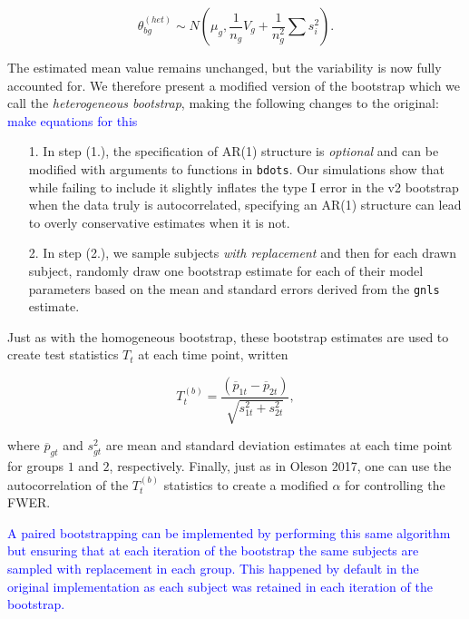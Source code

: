 \documentclass{article}
\newcommand{\xt}{\texttt}
\providecommand{\cn}[1]{\textcolor{blue}{#1}}
\begin{document}
\begin{equation}\label{eq:w_rep_boot}
\theta_{bg}^{(het)} \sim N \left( \mu_{g}, \frac{1}{n_g} V_{g} + \frac{1}{n_g^2} \sum s_i^2 \right).
\end{equation}

The estimated mean value remains unchanged, but the variability is now fully accounted for. We therefore present a modified version of the bootstrap which we call the \textit{heterogeneous bootstrap}, making the following changes to the original: \cn{make equations for this}

\begin{enumerate}
\item[1.] In step (1.), the specification of AR(1) structure is \textit{optional} and can be modified with arguments to functions in \xt{bdots}. Our simulations show that while failing to include it slightly inflates the type I error in the v2 bootstrap when the data truly is autocorrelated, specifying an AR(1) structure can lead to overly conservative estimates when it is not.
\item[2.] In step (2.), we sample subjects \textit{with replacement} and then for each drawn subject, randomly draw one bootstrap estimate for each of their model parameters based on the mean and standard errors derived from the \xt{gnls} estimate.
\end{enumerate}

Just as with the homogeneous bootstrap, these bootstrap estimates are used to create test statistics $T_t$ at each time point, written

\begin{equation}
T_t^{(b)} = \frac{(\overline{p}_{1t} - \overline{p}_{2t})}{\sqrt{s_{1t}^2 + s_{2t}^2}},
\end{equation}

where $\overline{p}_{gt}$ and $s_{gt}^2$ are mean and standard deviation estimates at each time point for groups $1$ and $2$, respectively. Finally, just as in Oleson 2017, one can use the autocorrelation of the $T_t^{(b)}$ statistics to create a modified $\alpha$ for controlling the FWER.



\cn{A paired bootstrapping can be implemented by performing this same algorithm but ensuring that at each iteration of the bootstrap the same subjects are sampled with replacement in each group. This happened by default in the original implementation as each subject was retained in each iteration of the bootstrap.}
\end{document}
